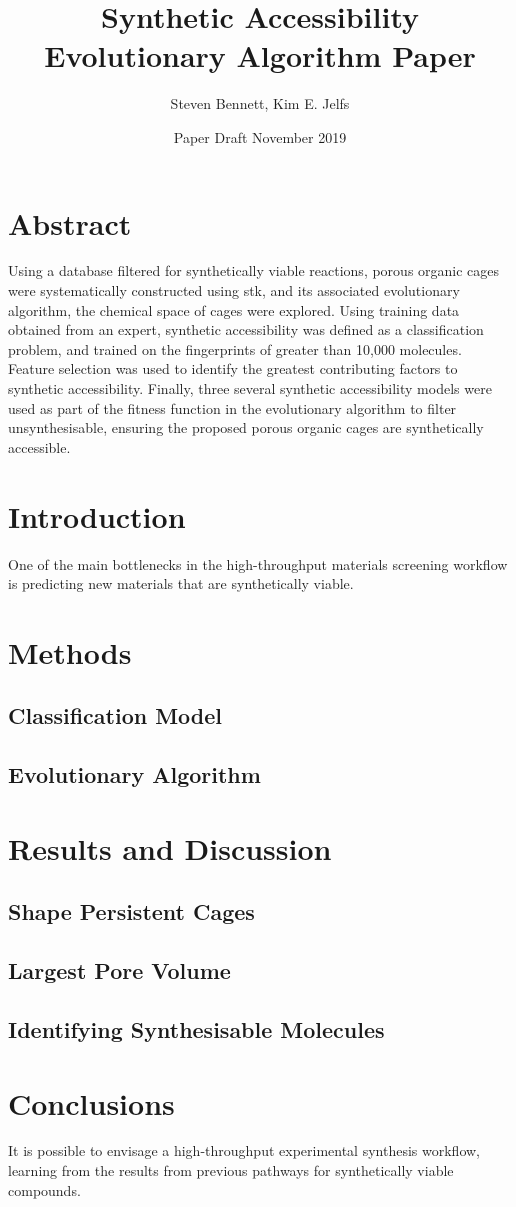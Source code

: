 \documentclass[12pt, letterpaper]{article}
\title{Synthetic Accessibility Evolutionary Algorithm Paper}
\author{Steven Bennett, Kim E. Jelfs}
\date{Paper Draft November 2019}
\begin{document}
\maketitle

\section{Abstract}
Using a database filtered for synthetically viable reactions, porous organic cages were
systematically constructed using stk, and its associated evolutionary algorithm, the
chemical space of cages were explored. Using training data obtained from an expert, synthetic
accessibility was defined as a classification problem, and trained on the fingerprints of greater
than 10,000 molecules. Feature selection was used to identify the greatest contributing factors
to synthetic accessibility. Finally, three several synthetic accessibility models were used as part
of the fitness function in the evolutionary algorithm to filter unsynthesisable, ensuring the proposed
porous organic cages are synthetically accessible.

\section{Introduction}
One of the main bottlenecks in the high-throughput materials screening workflow is predicting new materials
that are synthetically viable.

\section{Methods}

\subsection{Classification Model}

\subsection{Evolutionary Algorithm}

\section{Results and Discussion}

\subsection{Shape Persistent Cages}

\subsection{Largest Pore Volume}

\subsection{Identifying Synthesisable Molecules}

\section{Conclusions}
It is possible to envisage a high-throughput experimental synthesis workflow, learning from the results from previous
pathways for synthetically viable compounds.
\end{document}
